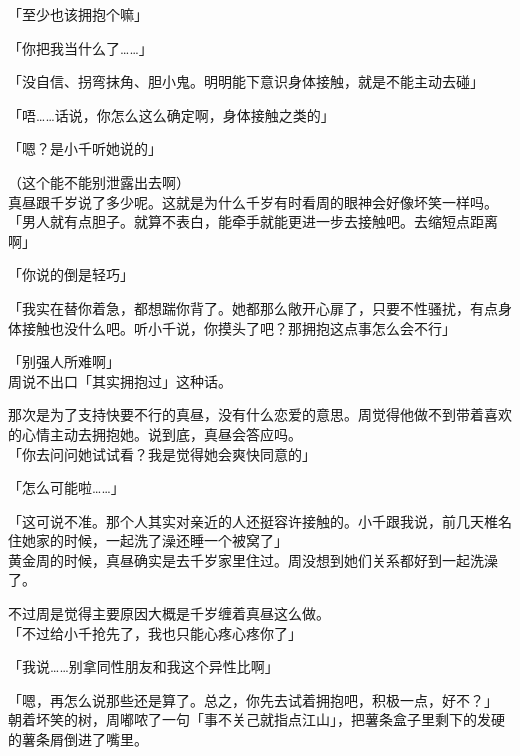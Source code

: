 「至少也该拥抱个嘛」

「你把我当什么了……」

「没自信、拐弯抹角、胆小鬼。明明能下意识身体接触，就是不能主动去碰」

「唔……话说，你怎么这么确定啊，身体接触之类的」

「嗯？是小千听她说的」

（这个能不能别泄露出去啊）\\

真昼跟千岁说了多少呢。这就是为什么千岁有时看周的眼神会好像坏笑一样吗。\\

「男人就有点胆子。就算不表白，能牵手就能更进一步去接触吧。去缩短点距离啊」

「你说的倒是轻巧」

「我实在替你着急，都想踹你背了。她都那么敞开心扉了，只要不性骚扰，有点身体接触也没什么吧。听小千说，你摸头了吧？那拥抱这点事怎么会不行」

「别强人所难啊」\\

周说不出口「其实拥抱过」这种话。

那次是为了支持快要不行的真昼，没有什么恋爱的意思。周觉得他做不到带着喜欢的心情主动去拥抱她。说到底，真昼会答应吗。\\

「你去问问她试试看？我是觉得她会爽快同意的」

「怎么可能啦……」

「这可说不准。那个人其实对亲近的人还挺容许接触的。小千跟我说，前几天椎名住她家的时候，一起洗了澡还睡一个被窝了」\\

黄金周的时候，真昼确实是去千岁家里住过。周没想到她们关系都好到一起洗澡了。

不过周是觉得主要原因大概是千岁缠着真昼这么做。\\

「不过给小千抢先了，我也只能心疼心疼你了」

「我说……别拿同性朋友和我这个异性比啊」

「嗯，再怎么说那些还是算了。总之，你先去试着拥抱吧，积极一点，好不？」\\

朝着坏笑的树，周嘟哝了一句「事不关己就指点江山」，把薯条盒子里剩下的发硬的薯条屑倒进了嘴里。
